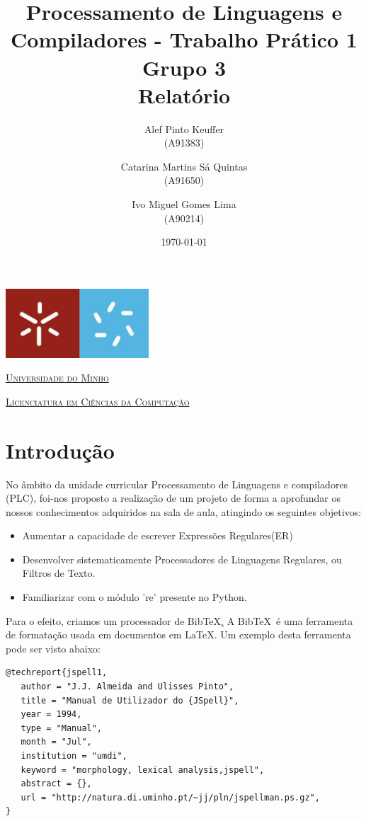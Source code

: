 \documentclass[11pt,a4paper]{report}
\title{Processamento de Linguagens e Compiladores - Trabalho Prático 1\\
       \textbf{Grupo 3}\\ Relatório
       } %
\author{Alef Pinto Keuffer\\ (A91383)\and Catarina Martins Sá Quintas \\ (A91650)\and  Ivo Miguel Gomes Lima \\(A90214)
       } %
\date{\today} %
\begin{document}
	\begin{minipage}{0.9\linewidth}
        \centering
		\includegraphics[width=0.4\textwidth]{um.jpeg}\par\vspace{1cm}
                \href{https://www.uminho.pt/PT}
		{\scshape\LARGE Universidade do Minho} \par
		\vspace{0.6cm}
                \href{https://lcc.di.uminho.pt}
		{\scshape\Large Licenciatura em Ciências da Computação} \par
		\maketitle
	\end{minipage}

\tableofcontents %

\chapter{Introdução}


No âmbito da unidade curricular Processamento de Linguagens e compiladores (PLC),
foi-nos proposto a realização de um projeto de forma a aprofundar os nossos
conhecimentos adquiridos na sala de aula, atingindo os seguintes objetivos:

\begin{itemize}
    \item Aumentar a capacidade de escrever Expressões Regulares(ER)
    \item Desenvolver sistematicamente Processadores de Linguagens Regulares, ou Filtros de Texto.
    \item Familiarizar com o módulo 're' presente no Python.
\end{itemize}
  

Para o efeito, criamos um  processador de Bib\TeX \href{http://www.bibtex.org/}. 
A Bib\TeX \ é uma ferramenta de formatação usada em documentos em La\TeX.
Um exemplo desta ferramenta pode ser visto abaixo: 
\begin{lstlisting}
@techreport{jspell1,
   author = "J.J. Almeida and Ulisses Pinto",
   title = "Manual de Utilizador do {JSpell}",
   year = 1994,
   type = "Manual",
   month = "Jul",
   institution = "umdi",
   keyword = "morphology, lexical analysis,jspell",
   abstract = {},
   url = "http://natura.di.uminho.pt/~jj/pln/jspellman.ps.gz",
}

\end{lstlisting}
\end{document}
